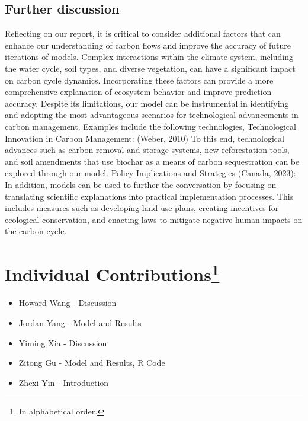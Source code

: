 \documentclass[a4paper]{article}
\begin{document}
\subsection{Further discussion}
Reflecting on our report, it is critical to consider additional factors that can enhance our understanding of carbon flows and improve the accuracy of future iterations of models. Complex interactions within the climate system, including the water cycle, soil types, and diverse vegetation, can have a significant impact on carbon cycle dynamics. Incorporating these factors can provide a more comprehensive explanation of ecosystem behavior and improve prediction accuracy. Despite its limitations, our model can be instrumental in identifying and adopting the most advantageous scenarios for technological advancements in carbon management. Examples include the following technologies, Technological Innovation in Carbon Management: (Weber, 2010) To this end, technological advances such as carbon removal and storage systems, new reforestation tools, and soil amendments that use biochar as a means of carbon sequestration can be explored through our model. Policy Implications and Strategies (Canada, 2023): In addition, models can be used to further the conversation by focusing on translating scientific explanations into practical implementation processes. This includes measures such as developing land use plans, creating incentives for ecological conservation, and enacting laws to mitigate negative human impacts on the carbon cycle.
    
\pagebreak




\nocite{*}



\section*{Individual Contributions\footnote{In alphabetical order.}}
\begin{itemize}
    \item Howard Wang - Discussion 
    \item Jordan Yang - Model and Results  
    \item Yiming Xia - Discussion 
    \item Zitong Gu - Model and Results, R Code
    \item Zhexi Yin - Introduction
\end{itemize}
\end{document}
